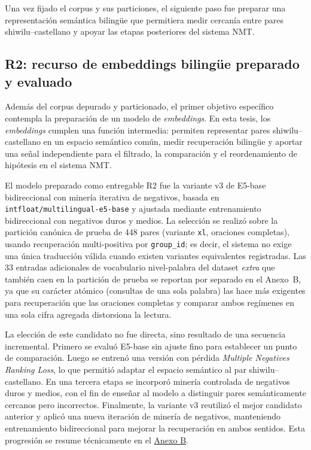 \documentclass[12pt,a4paper,oneside]{book}
\begin{document}
Una vez fijado el corpus y sus particiones, el siguiente paso fue preparar una representación semántica bilingüe que permitiera medir cercanía entre pares shiwilu--castellano y apoyar las etapas posteriores del sistema NMT.

\subsection{R2: recurso de embeddings bilingüe preparado y evaluado}\label{preparacion-del-modelo-de-embeddings}

Además del corpus depurado y particionado, el primer objetivo específico contempla la preparación de un modelo de \emph{embeddings}. En esta tesis, los \emph{embeddings} cumplen una función intermedia: permiten representar pares shiwilu--castellano en un espacio semántico común, medir recuperación bilingüe y aportar una señal independiente para el filtrado, la comparación y el reordenamiento de hipótesis en el sistema NMT.

El modelo preparado como entregable R2 fue la variante v3 de E5-base bidireccional con minería iterativa de negativos, basada en \texttt{intfloat/multilingual-e5-base} y ajustada mediante entrenamiento bidireccional con negativos duros y medios. La selección se realizó sobre la partición canónica de prueba de 448 pares (variante \texttt{xl}, oraciones completas), usando recuperación multi-positiva por \texttt{group\_id}; es decir, el sistema no exige una única traducción válida cuando existen variantes equivalentes registradas. Las 33 entradas adicionales de vocabulario nivel-palabra del dataset \emph{extra} que también caen en la partición de prueba se reportan por separado en el Anexo~B, ya que su carácter atómico (consultas de una sola palabra) las hace más exigentes para recuperación que las oraciones completas y comparar ambos regímenes en una sola cifra agregada distorsiona la lectura.

La elección de este candidato no fue directa, sino resultado de una secuencia incremental. Primero se evaluó E5-base sin ajuste fino para establecer un punto de comparación. Luego se entrenó una versión con pérdida \emph{Multiple Negatives Ranking Loss}, lo que permitió adaptar el espacio semántico al par shiwilu--castellano. En una tercera etapa se incorporó minería controlada de negativos duros y medios, con el fin de enseñar al modelo a distinguir pares semánticamente cercanos pero incorrectos. Finalmente, la variante v3 reutilizó el mejor candidato anterior y aplicó una nueva iteración de minería de negativos, manteniendo entrenamiento bidireccional para mejorar la recuperación en ambos sentidos. Esta progresión se resume técnicamente en el \hyperref[anexo-documento-reproducible]{Anexo B}.
\end{document}
